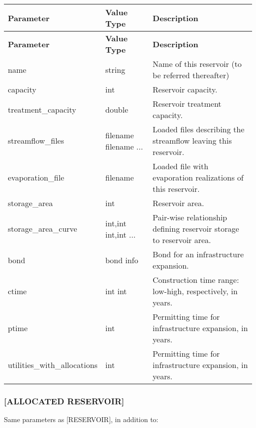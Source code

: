 \tabulinesep=1mm
\begin{longtabu} spread 0pt [c]{*{3}{|X[-1]}|}
\hline
\rowcolor{\tableheadbgcolor}\textbf{ Parameter  }&\textbf{ Value Type  }&\textbf{ Description   }\\
\endfirsthead
\hline
\endfoot
\hline
\rowcolor{\tableheadbgcolor}\textbf{ Parameter  }&\textbf{ Value Type  }&\textbf{ Description   }\\
\endhead
name  &string  &Name of this reservoir (to be referred thereafter)   \\
capacity  &int  &Reservoir capacity.   \\
treatment\+\_\+capacity  &double  &Reservoir treatment capacity.   \\
streamflow\+\_\+files  &filename filename ...  &Loaded files describing the streamflow leaving this reservoir.   \\
evaporation\+\_\+file  &filename  &Loaded file with evaporation realizations of this reservoir.   \\
storage\+\_\+area  &int  &Reservoir area.   \\
storage\+\_\+area\+\_\+curve  &int,int int,int ...  &Pair-\/wise relationship defining reservoir storage to reservoir area.   \\
bond  &bond info  &Bond for an infrastructure expansion.   \\
ctime  &int int  &Construction time range\+: low-\/high, respectively, in years.   \\
ptime  &int  &Permitting time for infrastructure expansion, in years.   \\
utilities\+\_\+with\+\_\+allocations  &int  &Permitting time for infrastructure expansion, in years.   \\
\end{longtabu}


\subsubsection*{\mbox{[}A\+L\+L\+O\+C\+A\+T\+ED R\+E\+S\+E\+R\+V\+O\+IR\mbox{]}}

Same parameters as \mbox{[}R\+E\+S\+E\+R\+V\+O\+IR\mbox{]}, in addition to\+:

